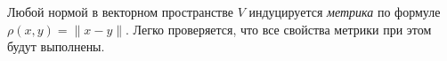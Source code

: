 Любой нормой в векторном пространстве $ V $ индуцируется \emph{метрика} по
формуле $ \rho(x, y) = \|x - y\| $. Легко проверяется, что все свойства метрики
при этом будут выполнены.

